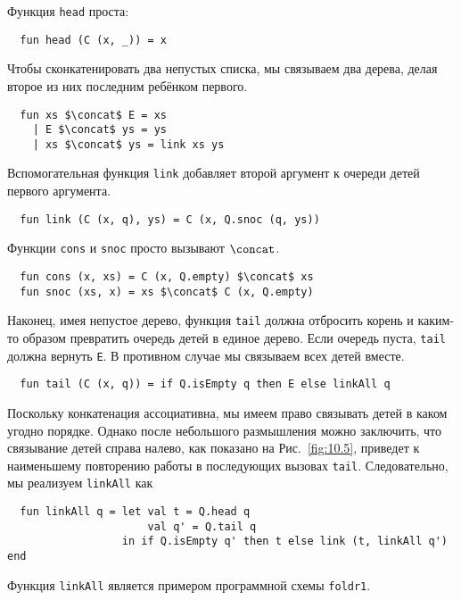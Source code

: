 Функция \lstinline!head! проста:
\begin{lstlisting}
  fun head (C (x, _)) = x
\end{lstlisting}
Чтобы сконкатенировать два непустых списка, мы связываем два дерева,
делая второе из них последним ребёнком первого.
\begin{lstlisting}
  fun xs $\concat$ E = xs
    | E $\concat$ ys = ys
    | xs $\concat$ ys = link xs ys
\end{lstlisting}
Вспомогательная функция \lstinline!link! добавляет второй аргумент к
очереди детей первого аргумента.
\begin{lstlisting}
  fun link (C (x, q), ys) = C (x, Q.snoc (q, ys))
\end{lstlisting}
Функции \lstinline!cons! и \lstinline!snoc! просто вызывают $\concat$.
\begin{lstlisting}
  fun cons (x, xs) = C (x, Q.empty) $\concat$ xs
  fun snoc (xs, x) = xs $\concat$ C (x, Q.empty)
\end{lstlisting}
Наконец, имея непустое дерево, функция \lstinline!tail! должна
отбросить корень и каким-то образом превратить очередь детей в единое
дерево. Если очередь пуста, \lstinline!tail! должна вернуть
\lstinline!E!. В противном случае мы связываем всех детей вместе.
\begin{lstlisting}
  fun tail (C (x, q)) = if Q.isEmpty q then E else linkAll q
\end{lstlisting}
Поскольку конкатенация ассоциативна, мы имеем право связывать детей в
каком угодно порядке. Однако после небольшого размышления можно
заключить, что связывание детей справа налево, как показано на
Рис.~\ref{fig:10.5}, приведет к наименьшему повторению работы в
последующих вызовах \lstinline!tail!. Следовательно, мы реализуем
\lstinline!linkAll! как
\begin{lstlisting}
  fun linkAll q = let val t = Q.head q
                      val q' = Q.tail q
                  in if Q.isEmpty q' then t else link (t, linkAll q') end
\end{lstlisting}

\begin{remark}
  Функция \lstinline!linkAll! является примером программной схемы \lstinline!foldr1!.
\end{remark}

